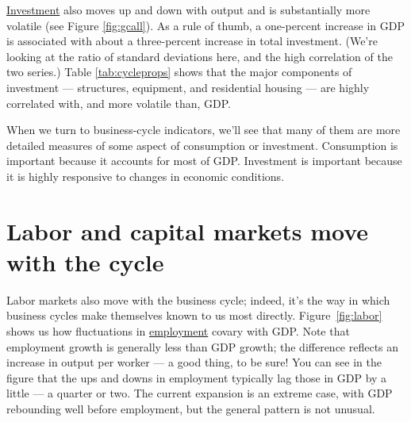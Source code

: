 \href{http://research.stlouisfed.org/fred2/series/GPDIC96?cid=112}{Investment}
also moves up and down with output
and is substantially more volatile (see Figure \ref{fig:gcall}).
As a rule of thumb, a one-percent increase in GDP is associated with
about a three-percent increase in total investment.
(We're looking at the ratio of standard deviations here,
and the high correlation of the two series.)
Table \ref{tab:cycleprops}
shows that the major components of investment --- structures, equipment,
and residential housing --- are highly correlated with,
and more volatile than, GDP.


When we turn to business-cycle indicators, we'll see that
many of them are more detailed measures of
some aspect of consumption or investment.
Consumption is important because it accounts for most of GDP.
Investment is important because it is highly responsive
to changes in economic conditions.


\section{Labor and capital markets move with the cycle}

Labor markets also move with the business cycle;
indeed, it's the way in which business cycles make themselves
known to us most directly.
Figure~\ref{fig:labor} shows us how fluctuations in
\href{http://research.stlouisfed.org/fred2/series/PAYEMS}{employment}
covary with GDP.
Note that employment growth is generally less than GDP growth;
the difference reflects an increase in output per worker --- a good thing, to be sure!
You can see in the figure that the ups and downs in employment
typically lag those in GDP by a little --- a quarter or two.
The current expansion is an extreme case, with
GDP rebounding well before employment,
but the general pattern is not unusual.

